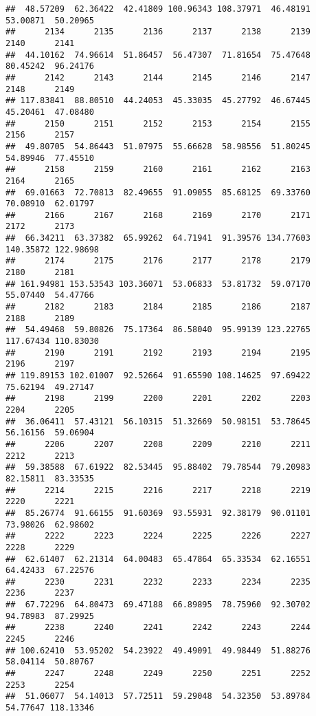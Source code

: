 \documentclass[
]{article}
\begin{document}
\begin{verbatim}
##  48.57209  62.36422  42.41809 100.96343 108.37971  46.48191  53.00871  50.20965 
##      2134      2135      2136      2137      2138      2139      2140      2141 
##  44.10162  74.96614  51.86457  56.47307  71.81654  75.47648  80.45242  96.24176 
##      2142      2143      2144      2145      2146      2147      2148      2149 
## 117.83841  88.80510  44.24053  45.33035  45.27792  46.67445  45.20461  47.08480 
##      2150      2151      2152      2153      2154      2155      2156      2157 
##  49.80705  54.86443  51.07975  55.66628  58.98556  51.80245  54.89946  77.45510 
##      2158      2159      2160      2161      2162      2163      2164      2165 
##  69.01663  72.70813  82.49655  91.09055  85.68125  69.33760  70.08910  62.01797 
##      2166      2167      2168      2169      2170      2171      2172      2173 
##  66.34211  63.37382  65.99262  64.71941  91.39576 134.77603 140.35872 122.98698 
##      2174      2175      2176      2177      2178      2179      2180      2181 
## 161.94981 153.53543 103.36071  53.06833  53.81732  59.07170  55.07440  54.47766 
##      2182      2183      2184      2185      2186      2187      2188      2189 
##  54.49468  59.80826  75.17364  86.58040  95.99139 123.22765 117.67434 110.83030 
##      2190      2191      2192      2193      2194      2195      2196      2197 
## 119.89153 102.01007  92.52664  91.65590 108.14625  97.69422  75.62194  49.27147 
##      2198      2199      2200      2201      2202      2203      2204      2205 
##  36.06411  57.43121  56.10315  51.32669  50.98151  53.78645  56.16156  59.06904 
##      2206      2207      2208      2209      2210      2211      2212      2213 
##  59.38588  67.61922  82.53445  95.88402  79.78544  79.20983  82.15811  83.33535 
##      2214      2215      2216      2217      2218      2219      2220      2221 
##  85.26774  91.66155  91.60369  93.55931  92.38179  90.01101  73.98026  62.98602 
##      2222      2223      2224      2225      2226      2227      2228      2229 
##  62.61407  62.21314  64.00483  65.47864  65.33534  62.16551  64.42433  67.22576 
##      2230      2231      2232      2233      2234      2235      2236      2237 
##  67.72296  64.80473  69.47188  66.89895  78.75960  92.30702  94.78983  87.29925 
##      2238      2240      2241      2242      2243      2244      2245      2246 
## 100.62410  53.95202  54.23922  49.49091  49.98449  51.88276  58.04114  50.80767 
##      2247      2248      2249      2250      2251      2252      2253      2254 
##  51.06077  54.14013  57.72511  59.29048  54.32350  53.89784  54.77647 118.13346 

\end{verbatim}
\end{document}
